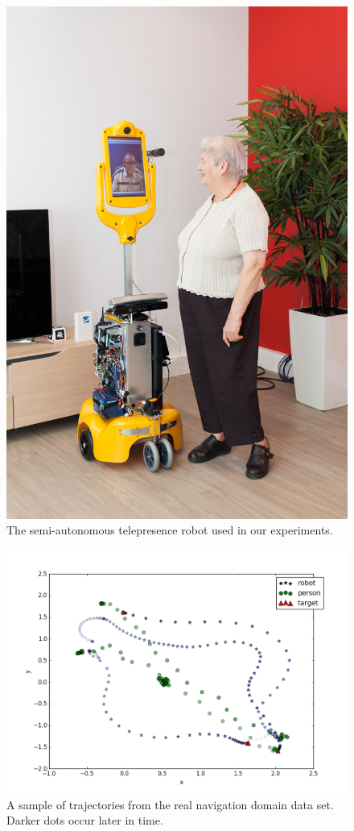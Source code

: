 \documentclass{aamas2016}
\begin{document}
\begin{figure}[t]     
  \centering
    \includegraphics[width=0.85\columnwidth]{images/robot.jpg}
  \caption{The semi-autonomous telepresence robot used in our experiments.}
  \label{fig:teresa_subject}
\end{figure}


\begin{figure}[t]     
  \centering
    \includegraphics[width=0.9\columnwidth]{images/data_plot.png}
  \caption{A sample of trajectories from the real navigation domain data set. Darker dots occur later in time.}
  \label{fig:data}
\end{figure}
\end{document}
